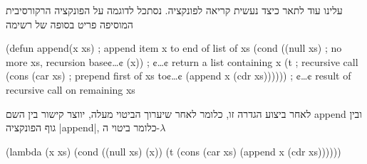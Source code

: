 עלינו עוד לתאר כיצד נעשית קריאה לפונקציה. נסתכל לדוגמה על הפונקציה הרקורסיבית
המוסיפה פריט בסופה של רשימה
\begin{LISP}
(defun append(x xs) ; append item x to end of list of xs
  (cond ((null xs) ; no more xs, recursion base¢…¢
          (x)) ; ¢…¢ return a list containing x
        (t ; recursive call
          (cons
            (car xs) ; prepend first of xs to¢…¢
            (append x (cdr xs)))))) ; ¢…¢ result of recursive call on remaining xs
\end{LISP}

\minipage\textwidth
לאחר ביצוע הגדרה זו, כלומר לאחר שיערוך הביטוי מעלה, יווצר קישור בין השם append
ובין גוף הפונקציה \E|append|, כלומר ביטוי ה-$λ$
\begin{LISP}
(lambda (x xs)
  (cond ((null xs) (x))
        (t (cons
              (car xs)
              (append x (cdr xs))))))
\end{LISP}
\endminipage

